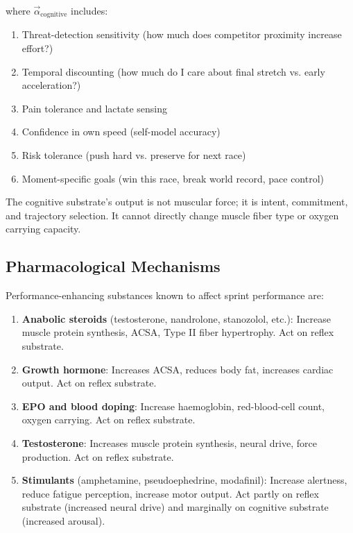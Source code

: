 \documentclass[11pt,twocolumn]{article}
\theoremstyle{definition}
\theoremstyle{remark}
\begin{document}
where $\vec{\alpha}_{\text{cognitive}}$ includes:
\begin{enumerate}[leftmargin=1.2em]
\item Threat-detection sensitivity (how much does competitor proximity increase effort?)
\item Temporal discounting (how much do I care about final stretch vs. early acceleration?)
\item Pain tolerance and lactate sensing
\item Confidence in own speed (self-model accuracy)
\item Risk tolerance (push hard vs. preserve for next race)
\item Moment-specific goals (win this race, break world record, pace control)
\end{enumerate}

The cognitive substrate's output is not muscular force; it is intent, commitment, and trajectory selection. It cannot directly change muscle fiber type or oxygen carrying capacity.

\subsection{Pharmacological Mechanisms}

Performance-enhancing substances known to affect sprint performance are:

\begin{enumerate}[leftmargin=1.2em]

\item \textbf{Anabolic steroids} (testosterone, nandrolone, stanozolol, etc.): Increase muscle protein synthesis, ACSA, Type II fiber hypertrophy. Act on reflex substrate.

\item \textbf{Growth hormone}: Increases ACSA, reduces body fat, increases cardiac output. Act on reflex substrate.

\item \textbf{EPO and blood doping}: Increase haemoglobin, red-blood-cell count, oxygen carrying. Act on reflex substrate.

\item \textbf{Testosterone}: Increases muscle protein synthesis, neural drive, force production. Act on reflex substrate.

\item \textbf{Stimulants} (amphetamine, pseudoephedrine, modafinil): Increase alertness, reduce fatigue perception, increase motor output. Act partly on reflex substrate (increased neural drive) and marginally on cognitive substrate (increased arousal).

\end{enumerate}
\end{document}
